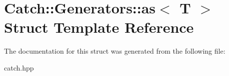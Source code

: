 \hypertarget{structCatch_1_1Generators_1_1as}{}\section{Catch\+:\+:Generators\+:\+:as$<$ T $>$ Struct Template Reference}
\label{structCatch_1_1Generators_1_1as}


The documentation for this struct was generated from the following file\+:\begin{DoxyCompactItemize}
\item 
catch.\+hpp\end{DoxyCompactItemize}
